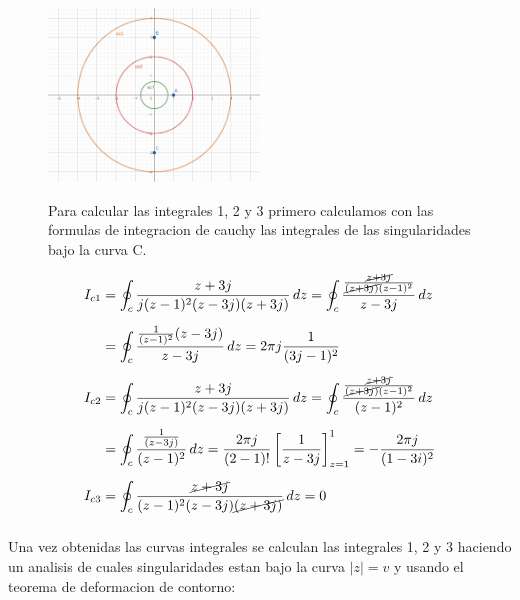 \documentclass[12pt]{report}
\begin{document}
\begin{figure}[htbp]
    \centering
    \includegraphics[width=0.5\textwidth]{./Imagenes/foto1Ej5.jpeg}
    \begin{minipage}[b]{0.4\textwidth}
       Para calcular las integrales 1, 2 y 3 primero calculamos con las formulas de integracion de cauchy las integrales de las singularidades bajo la curva C. 
    \end{minipage}
\end{figure}
\begin{align*}
    I_{c1} &= \oint_{c}\frac{z+3j}{j(z - 1)^2(z-3j)(z+3j)} \, dz =\oint_{c}\frac{\frac{\cancel{z+3j}}{\cancel{(z+3j)}(z-1)^2}}{z-3j} \, dz\\[6pt]
&= \oint_{c}\frac{\frac{1}{(z-1)^2}(z-3j)}{z-3j} \, dz = 2\pi j \frac{1}{(3j-1)^2}\\[6pt]
    I_{c2} &= \oint_{c}\frac{z+3j}{j(z - 1)^2(z-3j)(z+3j)} \, dz =\oint_{c}\frac{\frac{\cancel{z+3j}}{\cancel{(z+3j)}(z-1)^2}}{(z-1)^2} \, dz\\[6pt]
    &= \oint_{c}\frac{\frac{1}{(z-3j)}}{(z-1)^2} \, dz = \frac{2\pi j}{(2-1)!} \left[ \frac{1}{z-3j} \right]_{z=1}^1= -\frac{2\pi j}{(1-3i)^2} \\[6pt]
    I_{c3} &= \oint_{c}\frac{\cancel{z+3j}}{(z - 1)^2(z-3j)\cancel{(z+3j)}} \, dz=0 \\[6pt]
\end{align*}


Una vez obtenidas las curvas integrales se calculan las integrales 1, 2 y 3 haciendo un analisis de cuales singularidades estan bajo la curva $|z|=v$ y usando el teorema de deformacion de contorno: \\
\end{document}
